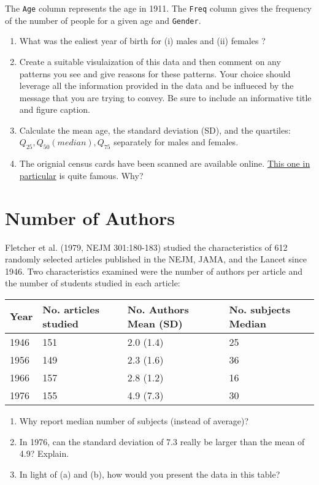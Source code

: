 \documentclass[letterpaper,9pt,twoside,printwatermark=false]{pinp}
\providecommand{\tightlist}{%
  \setlength{\itemsep}{0pt}\setlength{\parskip}{0pt}}
\begin{document}
The \texttt{Age} column represents the age in 1911. The \texttt{Freq}
column gives the frequency of the number of people for a given age and
\texttt{Gender}.

\begin{enumerate}
\def\labelenumi{\alph{enumi})}
\tightlist
\item
  What was the ealiest year of birth for (i) males and (ii) females ?
\item
  Create a suitable visulaization of this data and then comment on any
  patterns you see and give reasons for these patterns. Your choice
  should leverage all the information provided in the data and be
  influeced by the message that you are trying to convey. Be sure to
  include an informative title and figure caption.
\item
  Calculate the mean age, the standard deviation (SD), and the
  quartiles: \(Q_{25}, Q_{50} (median), Q_{75}\) separately for males
  and females.
\item
  The orignial census cards have been scanned are available online.
  \href{http://www.census.nationalarchives.ie/reels/nai000230598/}{This
  one in particular} is quite famous. Why?
\end{enumerate}

\section{Number of Authors}\label{number-of-authors}

Fletcher et al. (1979, NEJM 301:180-183) studied the characteristics of
612 randomly selected articles published in the NEJM, JAMA, and the
Lancet since 1946. Two characteristics examined were the number of
authors per article and the number of students studied in each article:

\begin{longtable}[]{@{}llll@{}}
\toprule
Year & No. articles studied & No. Authors Mean (SD) & No. subjects
Median\tabularnewline
\midrule
\endhead
1946 & 151 & 2.0 (1.4) & 25\tabularnewline
1956 & 149 & 2.3 (1.6) & 36\tabularnewline
1966 & 157 & 2.8 (1.2) & 16\tabularnewline
1976 & 155 & 4.9 (7.3) & 30\tabularnewline
\bottomrule
\end{longtable}

\begin{enumerate}
\def\labelenumi{\alph{enumi})}
\tightlist
\item
  Why report median number of subjects (instead of average)?
\item
  In 1976, can the standard deviation of 7.3 really be larger than the
  mean of 4.9? Explain.
\item
  In light of (a) and (b), how would you present the data in this table?
\end{enumerate}
\end{document}
